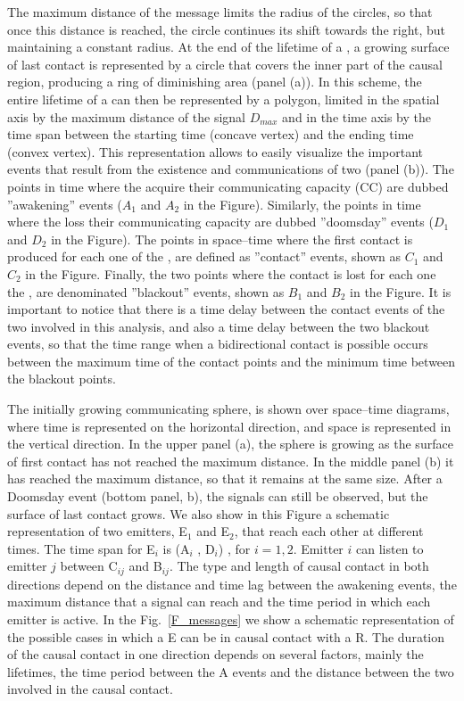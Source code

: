 %
The maximum distance of the message limits the radius of the circles,
so that once this distance is reached, the circle continues its shift
towards the right, but maintaining a constant radius.
%
At the end of the lifetime of a \ceti, a growing surface of last
contact is represented by a circle that covers the inner part of the
causal region, producing a ring of diminishing area (panel (a)).
%
In this scheme, the entire lifetime of a \ceti can then be represented
by a polygon, limited in the spatial axis by the maximum distance of
the signal $D_{max}$ and in the time axis by the time span between the
starting time (concave vertex) and the ending time (convex vertex).
%
This representation allows to easily visualize the important events
that result from the existence and communications of two \cetis (panel
(b)).
%
The points in time where the \cetis acquire their communicating capacity
(CC) are dubbed ''awakening'' events ($A_1$ and $A_2$ in the Figure).
%
Similarly, the points in time where the \cetis loss their
communicating capacity are dubbed ''doomsday'' events ($D_1$ and $D_2$
in the Figure).
%
The points in space--time where the first contact is produced for each
one of the \cetis, are defined as ''contact'' events, shown as $C_1$
and $C_2$ in the Figure.
%
Finally, the two points where the contact is lost for each one the
\cetis, are denominated ''blackout'' events, shown as $B_1$ and $B_2$
in the Figure.
%
It is important to notice that there is a time delay between the
contact events of the two \cetis involved in this analysis, and also a
time delay between the two blackout events, so that the time range
when a bidirectional contact is possible occurs between the maximum
time of the contact points and the minimum time between the blackout
points.




The initially growing communicating sphere, is shown over
space--time diagrams, where time is represented on the horizontal
direction, and space is represented in the vertical direction.
%
In the upper panel (a), the sphere is growing as the surface of first
contact has not reached the maximum distance.
%
In the middle panel (b) it has reached the maximum distance, so that
it remains at the same size.
%
After a Doomsday event (bottom panel, b), the signals can still be
observed, but the surface of last contact grows.
%
We also show in this Figure a schematic representation of two
emitters, E$_1$ and E$_2$, that reach each other at different times.
%
The time span for E$_i$ is (A$_i$ , D$_i$) , for $i = {1, 2}$.
%
Emitter $i$ can listen to emitter $j$ between C$_{ij}$ and B$_{ij}$.
%
The type and length of causal contact in both directions depend on the
distance and time lag between the awakening events, the maximum
distance that a signal can reach and the time period in which each
emitter is active.
%
In the Fig.~\ref{F_messages} we show a schematic representation of the
possible cases in which a \ceti E can be in causal contact with a
\ceti
R.
%
The duration of the causal contact in one direction depends on several
factors, mainly the lifetimes, the time period between the A events 
and the distance between the two \cetis involved in the causal
contact.



